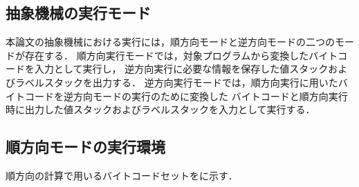 \documentclass[submit,PRO]{ipsj}
\begin{document}
\subsection{抽象機械の実行モード}

本論文の抽象機械における実行には，順方向モードと逆方向モードの二つのモードが存在する．
順方向実行モードでは，対象プログラムから変換したバイトコードを入力として実行し，
逆方向実行に必要な情報を保存した値スタックおよびラベルスタックを出力する．
逆方向実行モードでは，順方向実行に用いたバイトコードを逆方向モードの実行のために変換した
バイトコードと順方向実行時に出力した値スタックおよびラベルスタックを入力として実行する．


\subsection{順方向モードの実行環境}

順方向の計算で用いるバイトコードセットをに示す．
\end{document}
